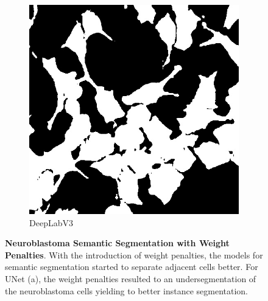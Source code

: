 \documentclass[journal]{IEEEtran}
\begin{document}
\begin{figure}
\begin{subfigure}[b]{0.45\linewidth}
\includegraphics[width=\linewidth]{weighted/110115-deeplab.jpg}
\caption{DeepLabV3}
\end{subfigure}
\caption{\textbf{Neuroblastoma Semantic Segmentation with Weight Penalties}. With the introduction of weight penalties, the models for semantic segmentation started to separate adjacent cells better. For UNet (a), the weight penalties resulted to an undersegmentation of the neuroblastoma cells yielding to better instance segmentation.}
\label{fig:segmentation_with_weight_map}
\end{figure}
\end{document}
